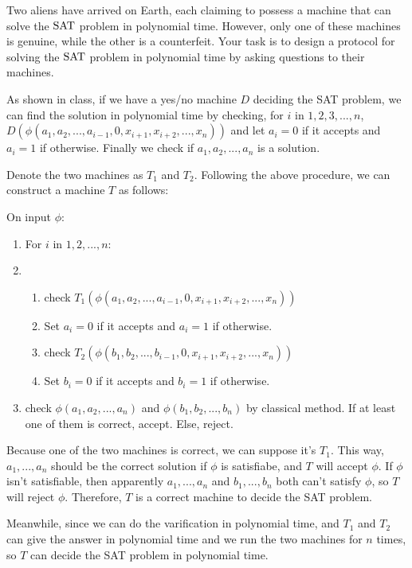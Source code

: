 \documentclass{homework}
\begin{document}
\begin{problem}
  Two aliens have arrived on Earth, each claiming to possess a machine that can
  solve the $\mathrm{SAT}$ problem in polynomial time.
  However, only one of these machines is genuine, while the other is a
  counterfeit.
  Your task is to design a protocol for solving the $\mathrm{SAT}$ problem in polynomial
  time by asking questions to their machines.
\end{problem}

\begin{solution}
  As shown in class, if we have a yes/no machine $D$ deciding the SAT problem, we can find the solution in polynomial time by checking, for $i$ in $1,2,3,...,n$, $D(\phi(a_1,a_2,...,a_{i-1},0,x_{i+1},x_{i+2},...,x_n))$ and let $a_i=0$ if it accepts and $a_i=1$ if otherwise. Finally we check if $a_1,a_2,...,a_n$ is a solution. 
  
  Denote the two machines as $T_1$ and $T_2$. Following the above procedure, we can construct a machine $T$ as follows:

  On input $\phi$:
  \begin{enumerate}
    \item For $i$ in $1,2,...,n$:
    \item \begin{enumerate}
      \item check $T_1(\phi(a_1,a_2,...,a_{i-1},0,x_{i+1},x_{i+2},...,x_n))$
      \item Set $a_i=0$ if it accepts and $a_i=1$ if otherwise.
      \item check $T_2(\phi(b_1,b_2,...,b_{i-1},0,x_{i+1},x_{i+2},...,x_n))$
      \item Set $b_i=0$ if it accepts and $b_i=1$ if otherwise.
    \end{enumerate}
    \item check $\phi(a_1,a_2,...,a_n)$ and $\phi(b_1,b_2,...,b_n)$ by classical method. If at least one of them is correct, accept. Else, reject.
    \end{enumerate}
  \end{solution}
  Because one of the two machines is correct, we can suppose it's $T_1$. This way, $a_1,...,a_n$ should be the correct solution if $\phi$ is satisfiabe, and $T$ will accept $\phi$. If $\phi$ isn't satisfiable, then apparently $a_1,...,a_n$ and $b_1,...,b_n$ both can't satisfy $\phi$, so $T$ will reject $\phi$. Therefore, $T$ is a correct machine to decide the SAT problem.

  Meanwhile, since we can do the varification in polynomial time, and $T_1$ and $T_2$ can give the answer in polynomial time and we run the two machines for $n$ times, so $T$ can decide the SAT problem in polynomial time.
\end{document}
